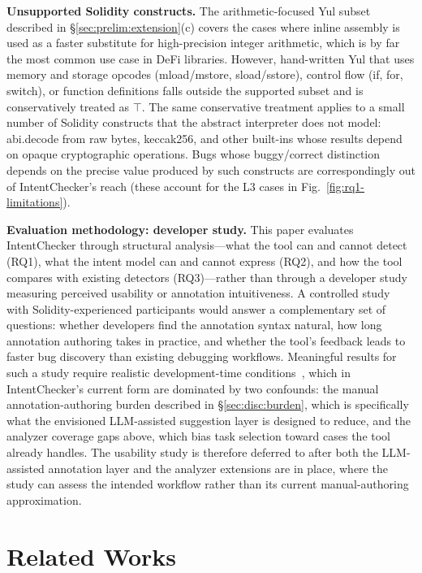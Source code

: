 \documentclass[pdflatex,sn-basic]{sn-jnl}%
\theoremstyle{thmstyleone}%
\theoremstyle{thmstyletwo}%
\theoremstyle{thmstylethree}%
\begin{document}
\smallskip
\noindent\textbf{Unsupported Solidity constructs.}
The arithmetic-focused Yul subset described in §\ref{sec:prelim:extension}(c) covers the cases where inline assembly is used as a faster substitute for high-precision integer arithmetic, which is by far the most common use case in DeFi libraries.
However, hand-written Yul that uses memory and storage opcodes (mload/mstore, sload/sstore), control flow (if, for, switch), or function definitions falls outside the supported subset and is conservatively treated as $\top$.
The same conservative treatment applies to a small number of Solidity constructs that the abstract interpreter does not model: abi.decode from raw bytes, keccak256, and other built-ins whose results depend on opaque cryptographic operations.
Bugs whose buggy/correct distinction depends on the precise value produced by such constructs are correspondingly out of IntentChecker's reach (these account for the L3 cases in Fig.~\ref{fig:rq1-limitations}).

\smallskip
\noindent\textbf{Evaluation methodology: developer study.}
This paper evaluates IntentChecker through structural analysis---what the tool can and cannot detect (RQ1), what the intent model can and cannot express (RQ2), and how the tool compares with existing detectors (RQ3)---rather than through a developer study measuring perceived usability or annotation intuitiveness.
A controlled study with Solidity-experienced participants would answer a complementary set of questions: whether developers find the annotation syntax natural, how long annotation authoring takes in practice, and whether the tool's feedback leads to faster bug discovery than existing debugging workflows.
Meaningful results for such a study require realistic development-time conditions~\citep{defisecurity}, which in IntentChecker's current form are dominated by two confounds: the manual annotation-authoring burden described in §\ref{sec:disc:burden}, which is specifically what the envisioned LLM-assisted suggestion layer is designed to reduce, and the analyzer coverage gaps above, which bias task selection toward cases the tool already handles.
The usability study is therefore deferred to after both the LLM-assisted annotation layer and the analyzer extensions are in place, where the study can assess the intended workflow rather than its current manual-authoring approximation.

\section{Related Works}\label{sec:related}
\end{document}
